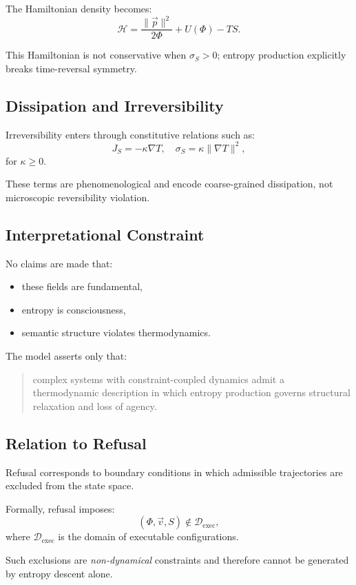 The Hamiltonian density becomes:
\[
\mathcal{H} = \frac{\|\vec{p}\|^2}{2\Phi} + U(\Phi) - T S.
\]

This Hamiltonian is not conservative when $\sigma_S > 0$;
entropy production explicitly breaks time-reversal symmetry.

\subsection{Dissipation and Irreversibility}

Irreversibility enters through constitutive relations such as:
\[
J_S = - \kappa \nabla T,
\quad
\sigma_S = \kappa \|\nabla T\|^2,
\]
for $\kappa \ge 0$.

These terms are phenomenological and encode coarse-grained dissipation,
not microscopic reversibility violation.

\subsection{Interpretational Constraint}

No claims are made that:
\begin{itemize}
  \item these fields are fundamental,
  \item entropy is consciousness,
  \item semantic structure violates thermodynamics.
\end{itemize}

The model asserts only that:
\begin{quote}
complex systems with constraint-coupled dynamics admit a thermodynamic description
in which entropy production governs structural relaxation and loss of agency.
\end{quote}

\subsection{Relation to Refusal}

Refusal corresponds to boundary conditions in which admissible trajectories
are excluded from the state space.

Formally, refusal imposes:
\[
(\Phi, \vec{v}, S) \notin \mathcal{D}_{\text{exec}},
\]
where $\mathcal{D}_{\text{exec}}$ is the domain of executable configurations.

Such exclusions are \emph{non-dynamical} constraints and therefore cannot be
generated by entropy descent alone.

